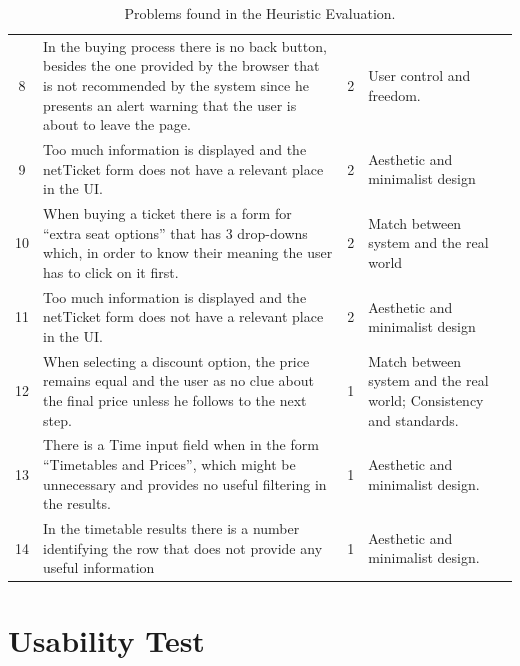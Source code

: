 \documentclass[a4paper]{article}
\begin{document}
\begin{table}[!h]
\begin{center}
\begin{tabular}{c | p{8cm} | c | p{4.5cm} }
8 & In the buying process there is no back button, besides the one provided by the browser that is not recommended by the system since he presents an alert warning that the user is about to leave the page. & \cellcolor{orange!20}2 & User control and freedom. \\

9 & Too much information is displayed and the netTicket form does not have a relevant place in the UI. &  \cellcolor{orange!20}2 & Aesthetic and minimalist design\\

10 & When buying a ticket there is a form for ``extra seat options'' that has 3 drop-downs which, in order to know their meaning the user has to click on it first. &  \cellcolor{orange!20}2 & Match between system and the real world\\

11 & Too much information is displayed and the netTicket form does not have a relevant place in the UI. &  \cellcolor{orange!20}2 & Aesthetic and minimalist design\\

12  &  When selecting a discount option, the price remains equal and the user as no clue about the final price unless he follows to the next step. & \cellcolor{yellow!10} 1 &  Match between system and the real world; Consistency and standards. \\

	13  &  There is a Time input field when in the form ``Timetables and Prices'', which might be unnecessary and provides no useful filtering in the results.  & \cellcolor{yellow!10} 1 &  Aesthetic and minimalist design. \\
	
14 &  In the timetable results there is a number identifying the row that does not provide any useful information & \cellcolor{yellow!10} 1 & Aesthetic and minimalist design. \\
	
\hline
\end{tabular}
\end{center}
\caption{Problems found in the Heuristic Evaluation.}
\label{tab:heuristic_results}
\end{table}


\section{Usability Test}
\label{sec:usability_test}
\end{document}
